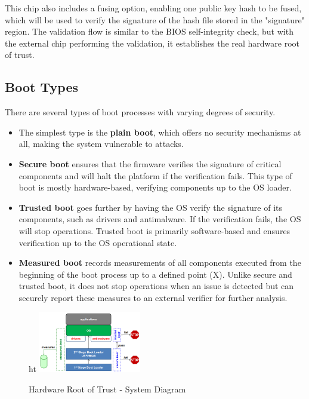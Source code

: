 This chip also includes a fusing option, enabling one public key hash to be fused, which will be used to verify the signature of the hash file stored in the "signature" region. The validation flow is similar to the BIOS self-integrity check, but with the external chip performing the validation, it establishes the real hardware root of trust.

\subsection{Boot Types}

There are several types of boot processes with varying degrees of security. 


\begin{itemize}[itemsep=0pt]
    \item The simplest type is the \textbf{plain boot}, which offers no security mechanisms at all, making the system vulnerable to attacks.
    \item \textbf{Secure boot} ensures that the firmware verifies the signature of critical components and will halt the platform if the verification fails. This type of boot is mostly hardware-based, verifying components up to the OS loader.
    \item \textbf{Trusted boot} goes further by having the OS verify the signature of its components, such as drivers and antimalware. If the verification fails, the OS will stop operations. Trusted boot is primarily software-based and ensures verification up to the OS operational state.
    \item \textbf{Measured boot} records measurements of all components executed from the beginning of the boot process up to a defined point (X). Unlike secure and trusted boot, it does not stop operations when an issue is detected but can securely report these measures to an external verifier for further analysis.
\end{itemize}

\begin{figure}{ht}
    \centering
    \includegraphics[width=0.4\textwidth]{img/boots.png}
    \caption{Hardware Root of Trust - System Diagram}
\end{figure}

